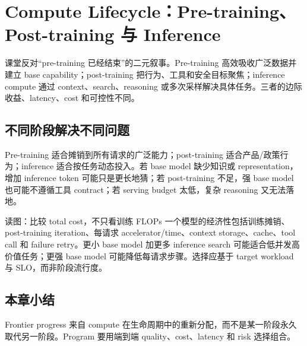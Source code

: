 \section{Compute Lifecycle：Pre-training、Post-training 与 Inference}

课堂反对“pre-training 已经结束”的二元叙事。Pre-training 高效吸收广泛数据并建立 base capability；post-training 把行为、工具和安全目标聚焦；inference compute 通过 context、search、reasoning 或多次采样解决具体任务。三者的边际收益、latency、cost 和可控性不同。

\subsection{不同阶段解决不同问题}

Pre-training 适合摊销到所有请求的广泛能力；post-training 适合产品/政策行为；inference 适合按任务动态投入。若 base model 缺少知识或 representation，增加 inference token 可能只是更长地猜；若 post-training 不足，强 base model 也可能不遵循工具 contract；若 serving budget 太低，复杂 reasoning 又无法落地。


\begin{knowledgebox}{读图：比较 total cost，不只看训练 FLOPs}
一个模型的经济性包括训练摊销、post-training iteration、每请求 accelerator/time、context storage、cache、tool call 和 failure retry。更小 base model 加更多 inference search 可能适合低并发高价值任务；更强 base model 可能降低每请求步骤。选择应基于 target workload 与 SLO，而非阶段流行度。
\end{knowledgebox}

\subsection{本章小结}

Frontier progress 来自 compute 在生命周期中的重新分配，而不是某一阶段永久取代另一阶段。Program 要用端到端 quality、cost、latency 和 risk 选择组合。

